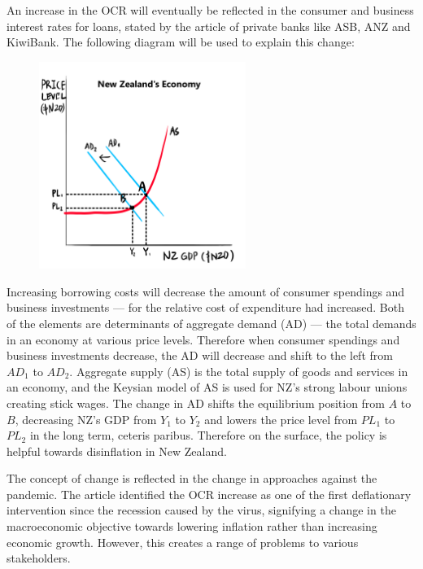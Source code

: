 \documentclass[a4paper,12pt]{article}
\begin{document}
An increase in the OCR will eventually be reflected in the consumer and business interest rates for loans, stated by the article of private banks like ASB, ANZ and KiwiBank. The following diagram will be used to explain this change:

\begin{figure}[H]
    \centering
    \includegraphics[width=0.6\textwidth]{assets/macro.png}
\end{figure}

Increasing borrowing costs will decrease the amount of consumer spendings and business investments --- for the relative cost of expenditure had increased. Both of the elements are determinants of aggregate demand (AD) --- the total demands in an economy at various price levels. Therefore when consumer spendings and business investments decrease, the AD will decrease and shift to the left from $AD_1$ to $AD_2$. Aggregate supply (AS) is the total supply of goods and services in an economy, and the Keysian model of AS is used for NZ's strong labour unions creating stick wages. The change in AD shifts the equilibrium position from $A$ to $B$, decreasing NZ's GDP from $Y_1$ to $Y_2$ and lowers the price level from $PL_1$ to $PL_2$ in the long term, ceteris paribus. Therefore on the surface, the policy is helpful towards disinflation in New Zealand.

The concept of change is reflected in the change in approaches against the pandemic. The article identified the OCR increase as one of the first deflationary intervention since the recession caused by the virus, signifying a change in the macroeconomic objective towards lowering inflation rather than increasing economic growth. However, this creates a range of problems to various stakeholders.
\end{document}
